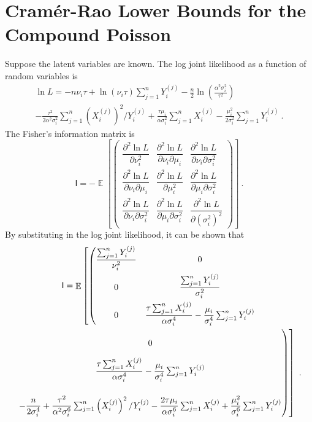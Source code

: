 \documentclass[12pt]{report}
\DeclareMathOperator{\expectation}{\mathbb{E}}
\newcommand{\matr}[1]{\mathsf{#1}}
\begin{document}
\section{Cram\'er-Rao Lower Bounds for the Compound Poisson}\label{chapter:crBound_compoundPoisson}
Suppose the latent variables are known. The log joint likelihood as a function of random variables is
\begin{multline}
\ln{L}= -n\nu_i\tau+\ln(\nu_i\tau)\sum_{j=1}^nY_i^{(j)}-\frac{n}{2}\ln\left(\frac{\alpha^2\sigma_i^2}{\tau^2}\right)
\\
-\frac{\tau^2}{2\alpha^2\sigma_i^2}\sum_{j=1}^n\left(X_i^{(j)}\right)^2/Y_i^{(j)}
+ \frac{\tau\mu_i}{\alpha\sigma_i^2}\sum_{j=1}^nX_i^{(j)}
-\frac{\mu_i^2}{2\sigma_i^2}\sum_{j=1}^nY_i^{(j)}
\ .
\end{multline}
The Fisher's information matrix is
\begin{equation}
\matr{I}=-\expectation\left[
\begin{pmatrix}
\dfrac{\partial^2\ln{L}}{\partial\nu_i^2} & \dfrac{\partial^2\ln{L}}{\partial\nu_i\partial\mu_i} & \dfrac{\partial^2\ln{L}}{\partial\nu_i\partial\sigma_i^2} 
\\[10pt]
\dfrac{\partial^2\ln{L}}{\partial\nu_i\partial\mu_i} & \dfrac{\partial^2\ln{L}}{\partial\mu_i^2} & \dfrac{\partial^2\ln{L}}{\partial\mu_i\partial\sigma_i^2}
\\[10pt]
\dfrac{\partial^2\ln{L}}{\partial\nu_i\partial\sigma_i^2} & \dfrac{\partial^2\ln{L}}{\partial\mu_i\partial\sigma_i^2} & \dfrac{\partial^2\ln{L}}{\partial\left(\sigma_i^2\right)^2}
\end{pmatrix}\right] \ .
\end{equation}
By substituting in the log joint likelihood, it can be shown that
\begin{multline}
\matr{I}=\expectation\left[
\left(\begin{matrix}
\dfrac{\sum_{j=1}^nY_i^{(j)}}{\nu_i^2} & 0
\\[10pt]
0 & \dfrac{\sum_{j=1}^nY_i^{(j)}}{\sigma_i^2}
\\[10pt]
0 & \dfrac{\tau\sum_{j=1}^nX_i^{(j)}}{\alpha\sigma_i^4}-\dfrac{\mu_i}{\sigma_i^4}\sum_{j=1}^nY_i^{(j)}
\end{matrix}\right.\right.
\\
\left.\left.\begin{matrix}
\vphantom{\dfrac{\sum_{j=1}^nY_i^{(j)}}{\nu_i^2}}0\\[10pt]
\dfrac{\tau\sum_{j=1}^nX_i^{(j)}}{\alpha\sigma_i^4}-\dfrac{\mu_i}{\sigma_i^4}\sum_{j=1}^nY_i^{(j)} \\[10pt]
\\
-\dfrac{n}{2\sigma_i^4}+\dfrac{\tau^2}{\alpha^2\sigma_i^6}\sum_{j=1}^n\left(X_i^{(j)}\right)^2/Y_i^{(j)}-\dfrac{2\tau\mu_i}{\alpha\sigma_i^6}\sum_{j=1}^nX_i^{(j)}+\dfrac{\mu_i^2}{\sigma_i^6}\sum_{j=1}^nY_i^{(j)}
\end{matrix}\right)\right] \ .
\end{multline}
\end{document}
